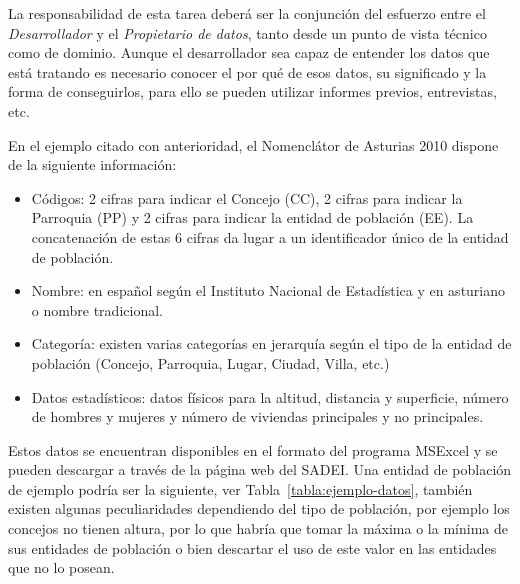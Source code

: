 La responsabilidad de esta tarea deberá ser la conjunción del esfuerzo entre el \textit{Desarrollador} y el \textit{Propietario de datos}, 
tanto desde un punto de vista técnico como de dominio. Aunque el desarrollador sea capaz de entender los datos que está tratando es necesario conocer el por qué de esos datos, su significado
y la forma de conseguirlos, para ello se pueden utilizar informes previos, entrevistas, etc.

En el ejemplo citado con anterioridad, el Nomenclátor de Asturias 2010 dispone de la siguiente información:
\begin{itemize}
 \item Códigos: 2 cifras para indicar el Concejo (CC), 2 cifras para indicar la Parroquia (PP) y 2 cifras para indicar la entidad de población (EE). La
concatenación de estas 6 cifras da lugar a un identificador único de la entidad de población.
\item Nombre: en español según el Instituto Nacional de Estadística y en asturiano o nombre tradicional.
\item Categoría: existen varias categorías en jerarquía según el tipo de la entidad de población (Concejo, Parroquia, Lugar, Ciudad, Villa, etc.)
\item Datos estadísticos: datos físicos para la altitud, distancia y superficie, número de hombres y mujeres y número de viviendas
principales y no principales.
\end{itemize}

Estos datos se encuentran disponibles en el formato del programa MSExcel y se pueden descargar a través de la página web del SADEI. Una entidad
de población de ejemplo podría ser la siguiente, ver Tabla~\ref{tabla:ejemplo-datos}, también existen algunas peculiaridades dependiendo
del tipo de población, por ejemplo los concejos no tienen altura, por lo que habría que tomar la máxima o la mínima de sus entidades
de población o bien descartar el uso de este valor en las entidades que no lo posean.


